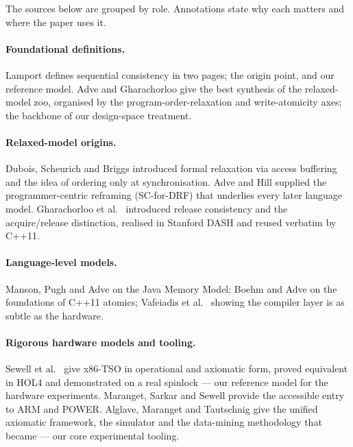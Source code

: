 The sources below are grouped by role.
Annotations state why each matters and where the paper uses it.

\paragraph{Foundational definitions.}
Lamport \cite{lamport1979multiprocessor} defines sequential consistency in two
pages; the origin point, and our reference model.
Adve and Gharachorloo \cite{adve1996shared} give the best synthesis of the
relaxed-model zoo, organised by the program-order-relaxation and write-atomicity
axes; the backbone of our design-space treatment.

\paragraph{Relaxed-model origins.}
Dubois, Scheurich and Briggs \cite{dubois1986memory} introduced formal
relaxation via access buffering and the idea of ordering only at synchronisation.
Adve and Hill \cite{adve1990weak} supplied the programmer-centric reframing
(SC-for-DRF) that underlies every later language model.
Gharachorloo et al.\ \cite{gharachorloo1990memory} introduced release
consistency and the acquire/release distinction, realised in Stanford DASH and
reused verbatim by C++11.

\paragraph{Language-level models.}
Manson, Pugh and Adve \cite{manson2005java} on the Java Memory Model; Boehm and
Adve \cite{boehm2008foundations} on the foundations of C++11 atomics; Vafeiadis
et al.\ \cite{vafeiadis2015common} showing the compiler layer is as subtle as
the hardware.

\paragraph{Rigorous hardware models and tooling.}
Sewell et al.\ \cite{sewell2010x86tso} give x86-TSO in operational and axiomatic
form, proved equivalent in HOL4 and demonstrated on a real spinlock --- our
reference model for the hardware experiments.
Maranget, Sarkar and Sewell \cite{maranget2012tutorial} provide the accessible
entry to ARM and POWER.
Alglave, Maranget and Tautschnig \cite{alglave2014herding} give the unified
axiomatic framework, the  simulator and the data-mining methodology
that became  --- our core experimental tooling.

